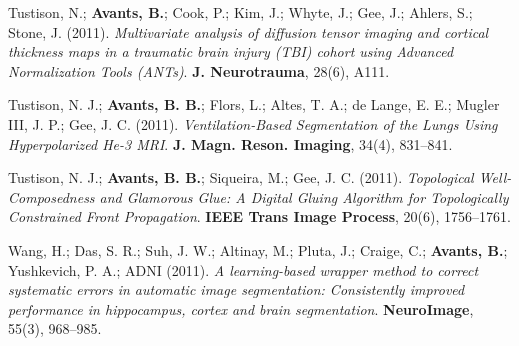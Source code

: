 \documentclass[10pt,letterpaper]{article}
\begin{document}
\begin{enumerate}
{  \item Tustison, N.; \textbf{Avants, B.}; Cook, P.; Kim, J.; Whyte, J.; Gee, J.; Ahlers, S.; Stone, J. (2011). \textit{Multivariate analysis of diffusion tensor imaging and cortical thickness maps in a traumatic brain injury (TBI) cohort using Advanced Normalization Tools (ANTs)}. \textbf{J. Neurotrauma}, 28(6), A111.
  \item Tustison, N. J.; \textbf{Avants, B. B.}; Flors, L.; Altes, T. A.; de Lange, E. E.; Mugler III, J. P.; Gee, J. C. (2011). \textit{Ventilation-Based Segmentation of the Lungs Using Hyperpolarized He-3 MRI}. \textbf{J. Magn. Reson. Imaging}, 34(4), 831--841.
  \item Tustison, N. J.; \textbf{Avants, B. B.}; Siqueira, M.; Gee, J. C. (2011). \textit{Topological Well-Composedness and Glamorous Glue: A Digital Gluing Algorithm for Topologically Constrained Front Propagation}. \textbf{IEEE Trans Image Process}, 20(6), 1756--1761.
  \item Wang, H.; Das, S. R.; Suh, J. W.; Altinay, M.; Pluta, J.; Craige, C.; \textbf{Avants, B.}; Yushkevich, P. A.; ADNI (2011). \textit{A learning-based wrapper method to correct systematic errors in automatic image segmentation: Consistently improved performance in hippocampus, cortex and brain segmentation}. \textbf{NeuroImage}, 55(3), 968--985.

}
\end{enumerate}
\end{document}
